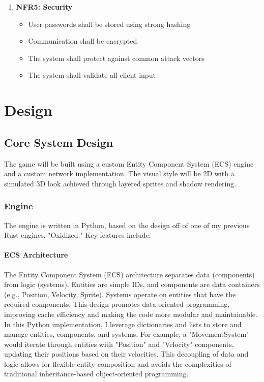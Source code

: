 \documentclass{article}
\begin{document}
\begin{enumerate}
    \item \textbf{NFR5: Security}
    \begin{itemize}
        \item User passwords shall be stored using strong hashing
        \item Communication shall be encrypted
        \item The system shall protect against common attack vectors
        \item The system shall validate all client input
    \end{itemize}
\end{enumerate}

\section{Design}

\subsection{Core System Design}

The game will be built using a custom Entity Component System (ECS) engine and a custom network implementation. The visual style will be 2D with a simulated 3D look achieved through layered sprites and shadow rendering.

\subsubsection{Engine}

The engine is written in Python, based on the design off of one of my previous Rust engines, "Oxidized." Key features include:

\paragraph{ECS Architecture}

The Entity Component System (ECS) architecture separates data (components) from logic (systems). Entities are simple IDs, and components are data containers (e.g., Position, Velocity, Sprite). Systems operate on entities that have the required components. This design promotes data-oriented programming, improving cache efficiency and making the code more modular and maintainable. In this Python implementation, I leverage dictionaries and lists to store and manage entities, components, and systems. For example, a "MovementSystem" would iterate through entities with "Position" and "Velocity" components, updating their positions based on their velocities. This decoupling of data and logic allows for flexible entity composition and avoids the complexities of traditional inheritance-based object-oriented programming.
\end{document}

